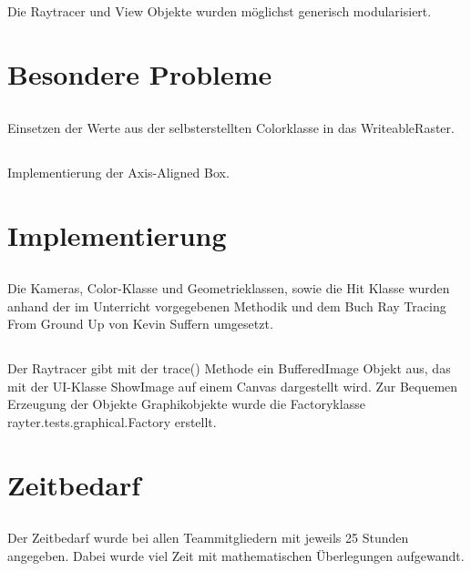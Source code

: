 \documentclass[11pt]{amsart}
\begin{document}
\subsection{}
Die Raytracer und View Objekte wurden m\"oglichst generisch
modularisiert.

\section{Besondere Probleme}
\subsection{}
Einsetzen der Werte aus der selbsterstellten Colorklasse in 
das WriteableRaster.

\subsection{}
Implementierung der Axis-Aligned Box.
\section{Implementierung}
\subsection{}
Die Kameras, Color-Klasse und Geometrieklassen, sowie die Hit Klasse wurden 
anhand der im Unterricht vorgegebenen Methodik und dem 
Buch Ray Tracing From Ground Up von Kevin Suffern
umgesetzt. 

\subsection{}
Der Raytracer gibt mit der trace() Methode ein BufferedImage Objekt aus, das mit der UI-Klasse ShowImage auf einem Canvas dargestellt wird.
Zur Bequemen Erzeugung der Objekte Graphikobjekte wurde die
Factoryklasse rayter.tests.graphical.Factory erstellt.


\section{Zeitbedarf}
\subsection{}
Der Zeitbedarf wurde bei allen Teammitgliedern mit jeweils 25 Stunden angegeben. Dabei 
wurde viel Zeit mit mathematischen \"Uberlegungen aufgewandt.
\end{document}
